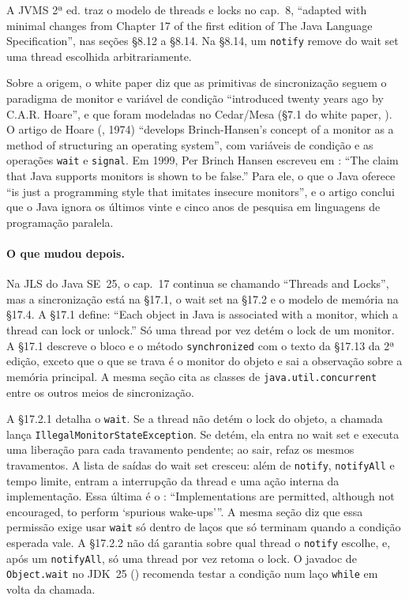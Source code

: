 A JVMS 2ª ed. traz o modelo de threads e locks no cap.~8, \enquote{adapted with
minimal changes from Chapter 17 of the first edition of The Java
Language Specification}, nas seções §8.12 a §8.14. Na §8.14, um
\texttt{notify} remove do wait set uma thread escolhida arbitrariamente.

Sobre a origem, o white paper diz que as primitivas de
sincronização seguem o paradigma de monitor e variável de condição
\enquote{introduced twenty years ago by C.A.R. Hoare}, e que foram
modeladas no Cedar/Mesa (§7.1 do white paper,
). O artigo de Hoare
(, 1974) \enquote{develops
Brinch-Hansen's concept of a monitor as a method of structuring an
operating system}, com variáveis de condição e as operações
\texttt{wait} e \texttt{signal}. Em 1999, Per Brinch Hansen
escreveu em :
\enquote{The claim that Java supports monitors is shown to be false.}
Para ele, o que o Java oferece \enquote{is just a programming style that
imitates insecure monitors}, e o artigo conclui que o Java ignora os
últimos vinte e cinco anos de pesquisa em linguagens de programação
paralela.

\paragraph{O que mudou depois.}
Na JLS do Java SE~25, o cap.~17 continua se chamando
\enquote{Threads and Locks}, mas a sincronização está na §17.1, o wait
set na §17.2 e o modelo de memória na §17.4. A §17.1 define:
\enquote{Each object in Java is associated with a monitor, which a
thread can lock or unlock.} Só uma thread por vez detém o lock de um
monitor. A §17.1 descreve o bloco e o método \texttt{synchronized} com o texto
da §17.13 da 2ª edição, exceto que o que se trava é o monitor do
objeto e sai a observação sobre a memória principal. A mesma seção cita as classes de
\texttt{java.util.concurrent} entre os outros meios de sincronização.

A §17.2.1 detalha o \texttt{wait}. Se a thread não detém o lock do
objeto, a chamada lança \texttt{IllegalMonitorStateException}. Se
detém, ela entra no wait set e executa uma liberação para cada
travamento pendente; ao sair, refaz os mesmos travamentos. A lista de saídas do wait set cresceu: além
de \texttt{notify}, \texttt{notifyAll} e tempo limite, entram a
interrupção da thread e uma ação interna da implementação. Essa última é
o : \enquote{Implementations are permitted, although not
encouraged, to perform \enquote{spurious wake-ups}}. A mesma seção diz que
essa permissão exige usar \texttt{wait} só dentro de laços que só
terminam quando a condição esperada vale. A §17.2.2 não dá garantia sobre qual
thread o \texttt{notify} escolhe, e, após um \texttt{notifyAll}, só uma
thread por vez retoma o lock. O javadoc de \texttt{Object.wait} no
JDK~25 () recomenda testar a condição
num laço \texttt{while} em volta da chamada.

